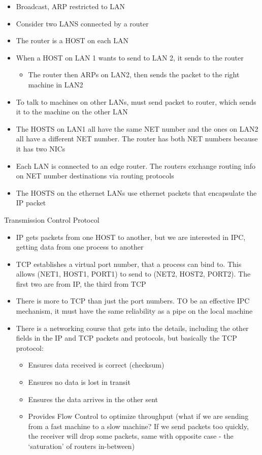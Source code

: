 \begin{itemize}
    \item Broadcast, ARP restricted to LAN
    \item Consider two  LANS connected by a router
    \item The router is a HOST on each LAN
    \item When a HOST on LAN 1 wants to send to LAN 2, it sends to the router
    \begin{itemize}
        \item The router then ARPs on LAN2, then sends the packet to the right machine in LAN2
    \end{itemize}
    \item To talk to machines on other LANs, must send packet to router, which sends it to the machine on the other LAN
    \item The HOSTS on LAN1 all have the same NET number and the ones on LAN2 all have a different NET number. The router has both NET numbers  because it has two NICs
    \item Each LAN is connected to an edge router. The routers exchange routing info on NET number destinations via routing protocols
    \item The HOSTS on the ethernet LANs use ethernet packets that encapsulate the IP packet
\end{itemize}
Transmission Control Protocol
\begin{itemize}
    \item IP gets packets from one HOST to another, but we are interested in IPC, getting data from one process to another
    \item TCP establishes a virtual port number, that a process can bind to. This allows (NET1, HOST1, PORT1) to send to (NET2, HOST2, PORT2). The first two are from IP, the third from TCP
    \item There is more to TCP than just the port numbers. TO be an effective IPC mechanism, it must have the same reliability as a pipe on the local machine
    \item There is a networking course that gets into the details, including the other fields in the IP and TCP packets and protocols, but basically the TCP protocol:
    \begin{itemize}
        \item Ensures data received is correct (checksum)
        \item Ensures no data is lost in transit
        \item Ensures the data arrives in the other sent
        \item Provides Flow Control to optimize throughput (what if we are sending from a fast machine to a slow machine? If we send packets too quickly, the receiver will drop some packets, same with opposite case - the `saturation' of routers in-between)
    \end{itemize}
\end{itemize}
